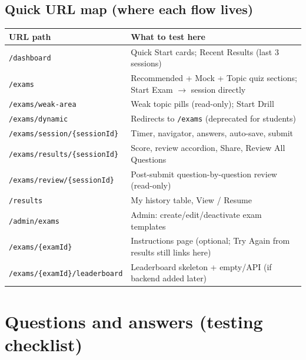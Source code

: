 \documentclass[11pt,a4paper]{article}
\begin{document}
\subsection{Quick URL map (where each flow lives)}

\begin{center}
\begin{tabular}{@{}ll@{}}
\toprule
\textbf{URL path} & \textbf{What to test here} \\
\midrule
\texttt{/dashboard} & Quick Start cards; Recent Results (last 3 sessions) \\
\texttt{/exams} & Recommended + Mock + Topic quiz sections; Start Exam $\rightarrow$ session directly \\
\texttt{/exams/weak-area} & Weak topic pills (read-only); Start Drill \\
\texttt{/exams/dynamic} & Redirects to \texttt{/exams} (deprecated for students) \\
\texttt{/exams/session/\{sessionId\}} & Timer, navigator, answers, auto-save, submit \\
\texttt{/exams/results/\{sessionId\}} & Score, review accordion, Share, Review All Questions \\
\texttt{/exams/review/\{sessionId\}} & Post-submit question-by-question review (read-only) \\
\texttt{/results} & My history table, View / Resume \\
\texttt{/admin/exams} & Admin: create/edit/deactivate exam templates \\
\texttt{/exams/\{examId\}} & Instructions page (optional; Try Again from results still links here) \\
\texttt{/exams/\{examId\}/leaderboard} & Leaderboard skeleton + empty/API (if backend added later) \\
\bottomrule
\end{tabular}
\end{center}

\section{Questions and answers (testing checklist)}
\end{document}
